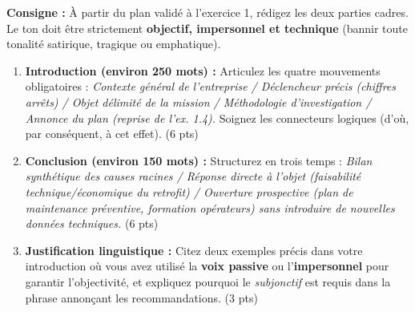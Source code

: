 \documentclass[11pt]{article}
\begin{document}
\begin{exercice}
\textbf{Consigne :} À partir du plan validé à l'exercice 1, rédigez les deux parties cadres. Le ton doit être strictement \textbf{objectif, impersonnel et technique} (bannir toute tonalité satirique, tragique ou emphatique).

\begin{enumerate}
    \item \textbf{Introduction (environ 250 mots) :} Articulez les quatre mouvements obligatoires : \textit{Contexte général de l'entreprise / Déclencheur précis (chiffres arrêts) / Objet délimité de la mission / Méthodologie d'investigation / Annonce du plan (reprise de l'ex. 1.4).} Soignez les connecteurs logiques (d'où, par conséquent, à cet effet). (6 pts)
    \item \textbf{Conclusion (environ 150 mots) :} Structurez en trois temps : \textit{Bilan synthétique des causes racines / Réponse directe à l'objet (faisabilité technique/économique du retrofit) / Ouverture prospective (plan de maintenance préventive, formation opérateurs) sans introduire de nouvelles données techniques.} (6 pts)
    \item \textbf{Justification linguistique :} Citez deux exemples précis dans votre introduction où vous avez utilisé la \textbf{voix passive} ou l'\textbf{impersonnel} pour garantir l'objectivité, et expliquez pourquoi le \textit{subjonctif} est requis dans la phrase annonçant les recommandations. (3 pts)
\end{enumerate}
\end{exercice}
\end{document}
